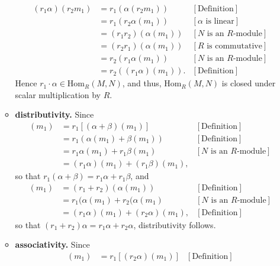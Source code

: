 \documentclass[9pt]{article}
\begin{document}
\begin{enumerate}
\begin{itemize}
\begin{align*}
                  (r_1\alpha)(r_2m_1) &= r_1 (\alpha(r_2m_1)) &[\text{Definition}] \\
                     &= r_1(r_2\alpha(m_1)) &[\alpha \text{ is linear}] \\
                     &= (r_1r_2)(\alpha(m_1)) &[N \text{ is an } R\text{-module}] \\
                     &= (r_2r_1)(\alpha(m_1)) &[R \text{ is commutative}] \\
                     &= r_2(r_1\alpha(m_1)) &[N \text{ is an } R\text{-module}] \\
                     &= r_2((r_1\alpha)(m_1)). &[\text{Definition}]
               \end{align*}
               Hence $r_1 \cdot \alpha \in \text{Hom}_R(M, N)$, and thus,
               $\text{Hom}_R(M, N)$ is closed under scalar multiplication by
               $R$.
         \item \textbf{distributivity.} Since
               \begin{align*}
                  [r_1(\alpha + \beta)](m_1) &= r_1[(\alpha + \beta)(m_1)]
                     &[\text{Definition}] \\
                     &= r_1(\alpha(m_1) + \beta(m_1)) &[\text{Definition}] \\
                     &= r_1\alpha(m_1) + r_1\beta(m_1)
                        &[N \text{ is an } R\text{-module}] \\
                     &= (r_1\alpha)(m_1) + (r_1\beta)(m_1),
               \end{align*}
               so that $r_1(\alpha + \beta) = r_1\alpha + r_1\beta$, and
               \begin{align*}
                  [(r_1 + r_2)\alpha](m_1) &= (r_1 + r_2)(\alpha(m_1))
                     &[\text{Definition}] \\
                     &= r_1(\alpha(m_1) + r_2(\alpha(m_1) 
                        &[N \text{ is an } R\text{-module}] \\
                     &= (r_1\alpha)(m_1) +(r_2\alpha)(m_1), &[\text{Definition}]
               \end{align*}
               so that $(r_1 + r_2)\alpha = r_1\alpha + r_2\alpha$,
               distributivity follows.
         \item \textbf{associativity.} Since
               \begin{align*}
                  [r_1(r_2\alpha)](m_1) &= r_1[(r_2\alpha)(m_1)]
                     &[\text{Definition}] \\

\end{align*}
\end{itemize}
\end{enumerate}
\end{document}

